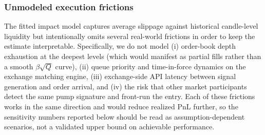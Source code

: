\documentclass{ieeeaccess}
\begin{document}
\subsubsection{Unmodeled execution frictions}
The fitted impact model captures average slippage against historical candle-level liquidity but intentionally omits several real-world frictions in order to keep the estimate interpretable. Specifically, we do not model (i) order-book depth exhaustion at the deepest levels (which would manifest as partial fills rather than a smooth $\beta\sqrt{Q}$ curve), (ii) queue priority and time-in-force dynamics on the exchange matching engine, (iii) exchange-side API latency between signal generation and order arrival, and (iv) the risk that other market participants detect the same pump signature and front-run the entry. Each of these frictions works in the same direction and would reduce realized PnL further, so the sensitivity numbers reported below should be read as \textcolor{revisionblue}{assumption-dependent scenarios, not a validated} upper bound on achievable performance.

\FloatBarrier %
\end{document}

